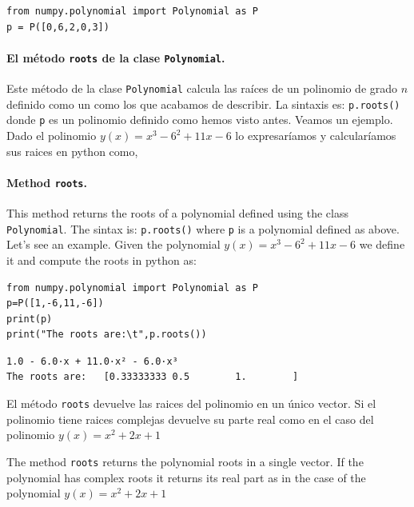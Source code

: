 \begin{verbatim}
from numpy.polynomial import Polynomial as P
p = P([0,6,2,0,3])
\end{verbatim}

\begin{paracol}{2}
\paragraph{El método \texttt{roots} de la clase \texttt{Polynomial}.}  Este método de la clase \texttt{Polynomial} calcula las raíces de un polinomio de grado $n$ definido como un  como los que acabamos de describir. La sintaxis es: \texttt{p.roots()} donde  \texttt{p} es un polinomio definido como hemos visto antes. Veamos un ejemplo. Dado el polinomio $y(x)=x^3-6^2+11x-6$ lo expresaríamos y calcularíamos sus raices en python como,

\switchcolumn
\paragraph{Method \texttt{roots}.}\index{} This method returns the roots of a polynomial defined using the class \texttt{Polynomial}. The sintax is: \texttt{p.roots()} where \texttt{p} is a polynomial defined as above. Let's see an example. Given the polynomial  $y(x)=x^3-6^2+11x-6$ we define it and compute the roots in python as:
\end{paracol}

\begin{verbatim}
from numpy.polynomial import Polynomial as P
p=P([1,-6,11,-6])
print(p)
print("The roots are:\t",p.roots())
\end{verbatim}
\begin{verbatim}
1.0 - 6.0·x + 11.0·x² - 6.0·x³
The roots are:	 [0.33333333 0.5        1.        ]

\end{verbatim}

\begin{paracol}{2}
El método \texttt{roots} devuelve las raices del polinomio en un único vector. Si el polinomio tiene raices complejas devuelve su parte real como en el caso del polinomio  $y(x)=x^2+2x+1$

\switchcolumn
The method \texttt{roots} returns the polynomial roots in a single vector. If the polynomial has complex roots it returns its real part as in the case of the polynomial $y(x)=x^2+2x+1$
\end{paracol}

